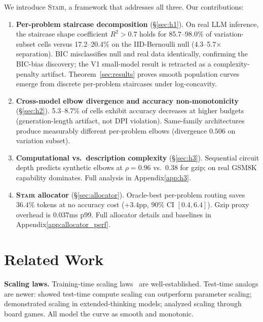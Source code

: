 \documentclass{article}
\newcommand{\method}{\textsc{Stair}}
\begin{document}
We introduce \method{}, a framework that addresses all three.  Our contributions:

\begin{enumerate}[leftmargin=*,itemsep=1pt]
    \item \textbf{Per-problem staircase decomposition} (\S\ref{sec:h1}).  On real LLM inference, the staircase shape coefficient $R^2 > 0.7$ holds for 85.7--98.0\% of variation-subset cells versus 17.2--20.4\% on the IID-Bernoulli null (4.3--5.7$\times$ separation).  BIC misclassifies null and real data identically, confirming the BIC-bias discovery; the V1 small-model result is retracted as a complexity-penalty artifact.  Theorem~\ref{sec:results} proves smooth population curves emerge from discrete per-problem staircases under log-concavity.
    \item \textbf{Cross-model elbow divergence and accuracy non-monotonicity} (\S\ref{sec:h2}).  5.3--8.7\% of cells exhibit accuracy decreases at higher budgets (generation-length artifact, not DPI violation).  Same-family architectures produce measurably different per-problem elbows (divergence $0.506$ on variation subset).
    \item \textbf{Computational vs.\ description complexity} (\S\ref{sec:h3}).  Sequential circuit depth predicts synthetic elbows at $\rho{=}0.96$ vs.\ $0.38$ for gzip; on real GSM8K capability dominates.  Full analysis in Appendix\ref{app:h3}.
    \item \textbf{\method{} allocator} (\S\ref{sec:allocator}).  Oracle-best per-problem routing saves $36.4\%$ tokens at no accuracy cost ($+3.4$pp, $90\%$ CI $[0.4,6.4]$).  Gzip proxy overhead is $0.037$ms p99.  Full allocator details and baselines in Appendix\ref{app:allocator_perf}.
\end{enumerate}

\section{Related Work}
\label{sec:related}

\textbf{Scaling laws.}  Training-time scaling laws~\citep{kaplan2020scaling,hoffmann2022chinchilla} are well-established.  Test-time analogs are newer: \citet{snell2024scaling} showed test-time compute scaling can outperform parameter scaling; \citet{brown2024scaling} demonstrated scaling in extended-thinking models; \citet{jones2021scaling} analyzed scaling through board games.  All model the curve as smooth and monotonic.
\end{document}
